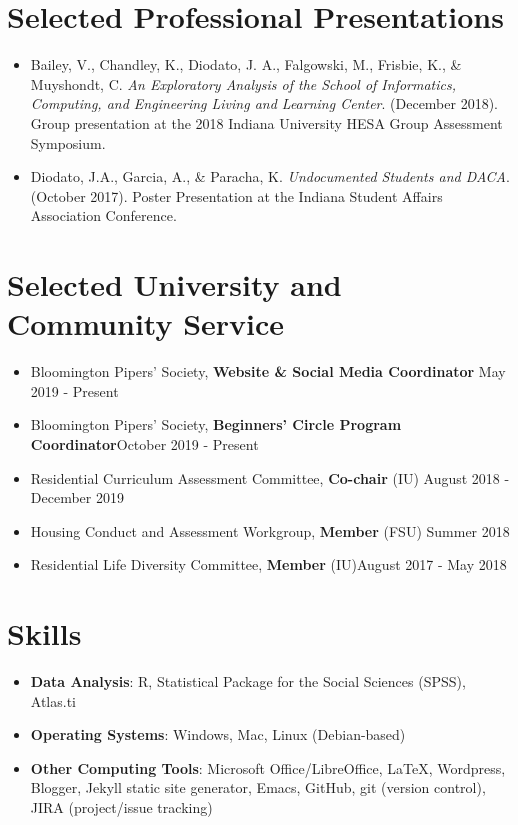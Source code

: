 \documentclass{article}
\begin{document}
\section*{Selected Professional Presentations\hrulefill}
\begin{itemize}
\item Bailey, V., Chandley, K., Diodato, J. A., Falgowski, M., Frisbie, K., \&
  Muyshondt, C. \textit{An Exploratory Analysis of the School of Informatics,
    Computing, and Engineering Living and Learning Center}. (December
  2018). Group presentation at the 2018 Indiana University HESA Group Assessment
  Symposium.
\item Diodato, J.A., Garcia, A., \& Paracha, K. \textit{Undocumented Students
    and DACA}. (October 2017). Poster Presentation at the Indiana Student
  Affairs Association Conference.

\end {itemize}

\section*{Selected University and Community Service \hrulefill}
\begin{itemize}
\item Bloomington Pipers' Society, \textbf{Website \& Social Media Coordinator}
  \hfill May 2019 - Present
\item Bloomington Pipers' Society, \textbf{Beginners' Circle Program
    Coordinator}\hfill October 2019 - Present
\item Residential Curriculum Assessment Committee, \textbf{Co-chair} (IU)\hfill
  August 2018 - December 2019
\item Housing Conduct and Assessment Workgroup, \textbf{Member} (FSU)\hfill
  Summer 2018
\item Residential Life Diversity Committee, \textbf{Member} (IU)\hfill August 2017 -
  May 2018
\end{itemize}

\section*{Skills \hrulefill}
\begin{itemize}
\item \textbf{Data Analysis}: R, Statistical Package for the Social Sciences
  (SPSS), Atlas.ti
\item \textbf{Operating Systems}: Windows, Mac, Linux (Debian-based)
\item \textbf{Other Computing Tools}: Microsoft Office/LibreOffice, \LaTeX,
  Wordpress, Blogger, Jekyll static site generator, Emacs, GitHub, git (version
  control), JIRA (project/issue tracking)
\end{itemize}
\end{document}
